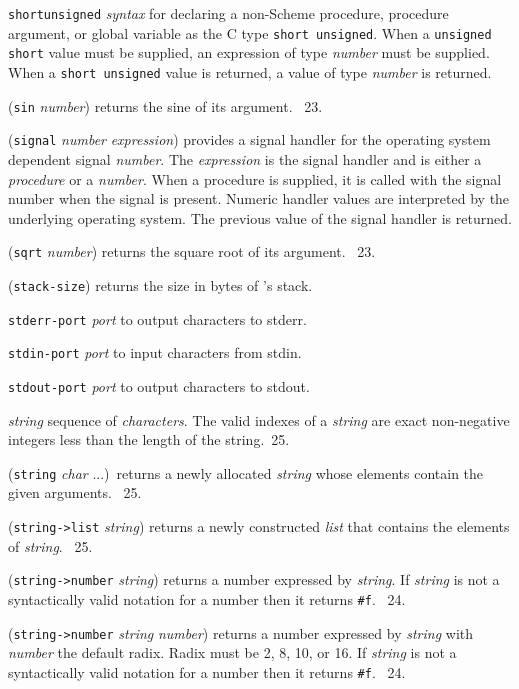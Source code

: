 \documentclass[10pt,twocolumn]{article}
\begin{document}
\texttt{shortunsigned} \emph{syntax} for declaring a non-Scheme
procedure, procedure argument, or global variable as the C type
\texttt{short unsigned}. When a \texttt{unsigned short} value must be
supplied, an expression of type \emph{number} must be supplied.  When
a \texttt{short unsigned} value is returned, a value of type
\emph{number} is returned.

(\texttt{sin} \emph{number}) returns the sine of its argument.
\RRRRRS~23.

(\texttt{signal} \emph{number} \emph{expression}) provides a signal
handler for the operating system dependent signal \emph{number}.  The
\emph{expression} is the signal handler and is either a
\emph{procedure} or a \emph{number}.  When a procedure is supplied, it
is called with the signal number when the signal is present.  Numeric
handler values are interpreted by the underlying operating system.
The previous value of the signal handler is returned.

(\texttt{sqrt} \emph{number}) returns the square root of its argument.
\RRRRRS~23.

(\texttt{stack-size}) returns the size in bytes of \StoC's stack.

\texttt{stderr-port} \emph{port} to output characters to stderr.

\texttt{stdin-port} \emph{port} to input characters from stdin.

\texttt{stdout-port} \emph{port} to output characters to stdout.

\emph{string} sequence of \emph{characters}.  The valid indexes of a
\emph{string} are exact non-negative integers less than the length of
the string.\RRRRRS~25.

(\texttt{string} \emph{char} ...)\ returns a newly allocated
\emph{string} whose elements contain the given arguments.  \RRRRRS~25.

(\texttt{string->list} \emph{string}) returns a newly constructed
\emph{list} that contains the elements of \emph{string}.  \RRRRRS~25.

(\texttt{string->number} \emph{string}) returns a number expressed by
\emph{string}.  If \emph{string} is not a syntactically valid notation
for a number then it returns \texttt{\#f}.  \RRRRRS~24.

(\texttt{string->number} \emph{string} \emph{number}) returns a number
expressed by \emph{string} with \emph{number} the default radix.
Radix must be 2, 8, 10, or 16. If \emph{string} is not a syntactically
valid notation for a number then it returns \texttt{\#f}.  \RRRRRS~24.
\end{document}
